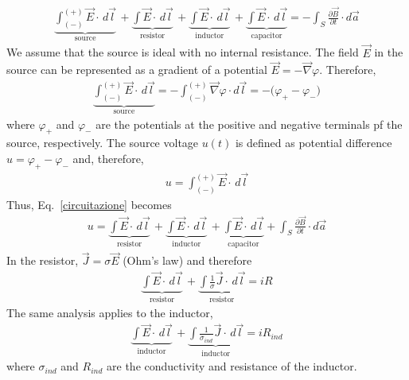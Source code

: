 \documentclass[11pt,a4paper,oneside]{book}
\numberwithin{equation}{section}
\theoremstyle{it}
\theoremstyle{definition}
\begin{document}
\begin{equation}\label{circuitazione}
	\begin{aligned}
		\underbrace{\int_{(-)}^{(+)}\vec{E}\cdot\,d\vec{l}}_{\text{source}} \, + \underbrace{\int\vec{E}\cdot\,d\vec{l}}_{\text{resistor}} \, + 
		\underbrace{\int\vec{E}\cdot\,d\vec{l}}_{\text{inductor}} \, + 
		\underbrace{\int\vec{E}\cdot\,d\vec{l}}_{\text{capacitor}} = - \int_{S}\frac{\partial \vec{B}}{\partial t}\cdot d\vec{a}
	\end{aligned}
\end{equation} 
We assume that the source is ideal with no internal resistance. The field $\vec{E}$ in the source can be represented as a gradient of a potential $\vec{E}=-\vec{\nabla}\varphi$. Therefore,
\begin{equation*}
	\begin{aligned}
		\underbrace{\int_{(-)}^{(+)}\vec{E}\cdot\,d\vec{l}}_{\text{source}} = - \int_{(-)}^{(+)}\vec{\nabla}\varphi\cdot d\vec{l} = -\Big(\varphi_+ - \varphi_-\Big)
	\end{aligned}
\end{equation*} 
where $\varphi_+$ and $\varphi_-$ are the potentials at the positive and negative terminals pf the source, respectively. The source voltage $u(t)$ is defined as potential difference $u=\varphi_+ - \varphi_-$  and, therefore,
\begin{equation}
	\begin{aligned}
		u = \int_{(-)}^{(+)}\vec{E}\cdot\,d\vec{l}
	\end{aligned}
\end{equation} 
Thus, Eq.~\eqref{circuitazione} becomes
\begin{equation}\label{circuitazione2}
	\begin{aligned}
		u = \underbrace{\int\vec{E}\cdot\,d\vec{l}}_{\text{resistor}} \, + 
		\underbrace{\int\vec{E}\cdot\,d\vec{l}}_{\text{inductor}} \, + 
		\underbrace{\int\vec{E}\cdot\,d\vec{l}}_{\text{capacitor}} + \int_{S}\frac{\partial \vec{B}}{\partial t}\cdot d\vec{a}
	\end{aligned}
\end{equation} 
In the resistor, $\vec{J}=\sigma\vec{E}$ (Ohm's law) and therefore
\begin{equation}\label{res}
	\begin{aligned}
		\underbrace{\int\vec{E}\cdot\,d\vec{l}}_{\text{resistor}} \, + 
	\underbrace{\int\frac{1}{\sigma}\vec{J}\cdot\,d\vec{l}}_{\text{resistor}} = iR
	\end{aligned}
\end{equation} 
The same analysis applies to the inductor, 
\begin{equation}\label{ind}
	\begin{aligned}
		\underbrace{\int\vec{E}\cdot\,d\vec{l}}_{\text{inductor}} \, + 
		\underbrace{\int\frac{1}{\sigma_{ind}}\vec{J}\cdot\,d\vec{l}}_{\text{inductor}} = iR_{ind}
	\end{aligned}
\end{equation} 
where $\sigma_{ind}$ and $R_{ind}$ are the conductivity and resistance of the inductor. 
\end{document}
